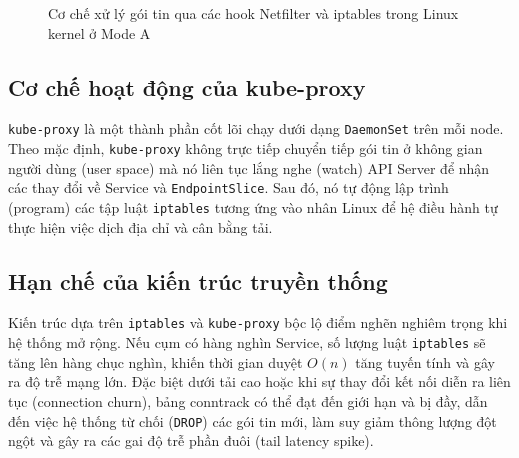 \begin{figure}[H]
{}
    \caption{Cơ chế xử lý gói tin qua các hook Netfilter và iptables trong Linux kernel ở Mode A}
    \label{fig:netfilter-iptables-flow}
\end{figure}

\subsection{Cơ chế hoạt động của kube-proxy}
\texttt{kube-proxy} là một thành phần cốt lõi chạy dưới dạng \texttt{DaemonSet} trên mỗi node. Theo mặc định, \texttt{kube-proxy} không trực tiếp chuyển tiếp gói tin ở không gian người dùng (user space) mà nó liên tục lắng nghe (watch) API Server để nhận các thay đổi về Service và \texttt{EndpointSlice}. Sau đó, nó tự động lập trình (program) các tập luật \texttt{iptables} tương ứng vào nhân Linux để hệ điều hành tự thực hiện việc dịch địa chỉ và cân bằng tải.

\subsection{Hạn chế của kiến trúc truyền thống}
Kiến trúc dựa trên \texttt{iptables} và \texttt{kube-proxy} bộc lộ điểm nghẽn nghiêm trọng khi hệ thống mở rộng. Nếu cụm có hàng nghìn Service, số lượng luật \texttt{iptables} sẽ tăng lên hàng chục nghìn, khiến thời gian duyệt $O(n)$ tăng tuyến tính và gây ra độ trễ mạng lớn. Đặc biệt dưới tải cao hoặc khi sự thay đổi kết nối diễn ra liên tục (connection churn), bảng conntrack có thể đạt đến giới hạn và bị đầy, dẫn đến việc hệ thống từ chối (\texttt{DROP}) các gói tin mới, làm suy giảm thông lượng đột ngột và gây ra các gai độ trễ phần đuôi (tail latency spike).

